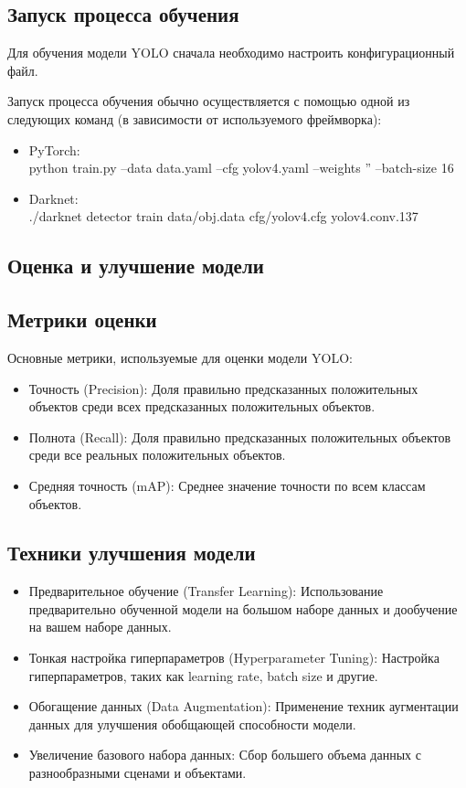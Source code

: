     \subsection{Запуск процесса обучения}
    Для обучения модели YOLO сначала необходимо настроить конфигурационный файл. 

    Запуск процесса обучения обычно осуществляется с помощью одной из следующих команд (в зависимости от используемого фреймворка):
    \begin{itemize}
        \item PyTorch: \\
          python train.py --data data.yaml --cfg yolov4.yaml --weights '' --batch-size 16
        \item Darknet: \\
          ./darknet detector train data/obj.data cfg/yolov4.cfg yolov4.conv.137
    \end{itemize}

    \subsection{Оценка и улучшение модели}

    \subsection{Метрики оценки}
    Основные метрики, используемые для оценки модели YOLO:
    \begin{itemize}
        \item Точность (Precision): Доля правильно предсказанных положительных объектов среди всех предсказанных положительных объектов.
        \item Полнота (Recall): Доля правильно предсказанных положительных объектов среди все реальных положительных объектов.
        \item Средняя точность (mAP): Среднее значение точности по всем классам объектов.
    \end{itemize}

    \subsection{Техники улучшения модели}

    \begin{itemize}
        \item Предварительное обучение (Transfer Learning): Использование предварительно обученной модели на большом наборе данных и дообучение на вашем наборе данных.
        \item Тонкая настройка гиперпараметров (Hyperparameter Tuning): Настройка гиперпараметров, таких как learning rate, batch size и другие.
        \item Обогащение данных (Data Augmentation): Применение техник аугментации данных для улучшения обобщающей способности модели.
        \item Увеличение базового набора данных: Сбор большего объема данных с разнообразными сценами и объектами.
    \end{itemize}

